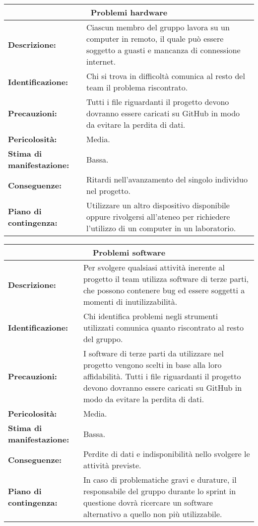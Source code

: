 \vspace{20pt}

\begin{tabularx}{\textwidth}{|X|X|}
\hline
\multicolumn{2}{|c|}{\textbf{Problemi hardware}} \\
\hline
\textbf{Descrizione:}& Ciascun membro del gruppo lavora su un computer in remoto, il quale può essere soggetto a guasti e mancanza di connessione internet.\\
\hline
\textbf{Identificazione:}& Chi si trova in difficoltà comunica al resto del team il problema riscontrato.\\
\hline
\textbf{Precauzioni:}& Tutti i file riguardanti il progetto devono dovranno essere caricati su GitHub in modo da evitare la perdita di dati.\\
\hline
\textbf{Pericolosità:}& Media.\\
\hline
\textbf{Stima di manifestazione:}& Bassa.\\
\hline
\textbf{Conseguenze:}& Ritardi nell'avanzamento del singolo individuo nel progetto.\\
\hline
\textbf{Piano di contingenza:}& Utilizzare un altro dispositivo disponibile oppure rivolgersi all'ateneo per richiedere l'utilizzo di un computer in un laboratorio.\\
\hline
\end{tabularx}

\vspace{70pt}

\begin{tabularx}{\textwidth}{|X|X|}
\hline
\multicolumn{2}{|c|}{\textbf{Problemi software}} \\
\hline
\textbf{Descrizione:}& Per svolgere qualsiasi attività inerente al progetto il team utilizza software di terze parti, che possono contenere bug ed essere soggetti a momenti di inutilizzabilità.\\
\hline
\textbf{Identificazione:}& Chi identifica problemi negli strumenti utilizzati comunica quanto riscontrato al resto del gruppo.\\
\hline
\textbf{Precauzioni:}& I software di terze parti da utilizzare nel progetto vengono scelti in base alla loro affidabilità. Tutti i file riguardanti il progetto devono dovranno essere caricati su GitHub in modo da evitare la perdita di dati.\\
\hline
\textbf{Pericolosità:}& Media.\\
\hline
\textbf{Stima di manifestazione:}& Bassa.\\
\hline
\textbf{Conseguenze:}& Perdite di dati e indisponibilità nello svolgere le attività previste.\\
\hline
\textbf{Piano di contingenza:}& In caso di problematiche gravi e durature, il responsabile del gruppo durante lo sprint in questione dovrà ricercare un software alternativo a quello non più utilizzabile.\\
\hline
\end{tabularx}

